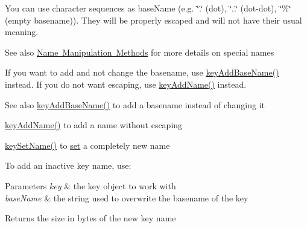You can use character sequences as {\ttfamily base\+Name} (e.\+g. {\ttfamily \char`\"{}.\char`\"{}} (dot), {\ttfamily \char`\"{}..\char`\"{}} (dot-\/dot), {\ttfamily \char`\"{}\%\char`\"{}} (empty basename)). They will be properly escaped and will not have their usual meaning.

\begin{DoxySeeAlso}{See also}
\mbox{\hyperlink{group__keyname}{Name Manipulation Methods}} for more details on special names
\end{DoxySeeAlso}
If you want to add and not change the basename, use \mbox{\hyperlink{group__keyname_gaa942091fc4bd5c2699e49ddc50829524}{key\+Add\+Base\+Name()}} instead. If you do not want escaping, use \mbox{\hyperlink{group__keyname_gaa70593a2c772c4b7bc33423b9b10a270}{key\+Add\+Name()}} instead.

\begin{DoxySeeAlso}{See also}
\mbox{\hyperlink{group__keyname_gaa942091fc4bd5c2699e49ddc50829524}{key\+Add\+Base\+Name()}} to add a basename instead of changing it 

\mbox{\hyperlink{group__keyname_gaa70593a2c772c4b7bc33423b9b10a270}{key\+Add\+Name()}} to add a name without escaping 

\mbox{\hyperlink{group__keyname_ga7699091610e7f3f43d2949514a4b35d9}{key\+Set\+Name()}} to \mbox{\hyperlink{classkdb_1_1Key_a615124f0a2b291e03975b49c233654d7}{set}} a completely new name
\end{DoxySeeAlso}
To add an inactive key name, use\+: 
\begin{DoxyCodeInclude}{0}
\end{DoxyCodeInclude}
 
\begin{DoxyParams}{Parameters}
{\em key} & the key object to work with \\
\hline
{\em base\+Name} & the string used to overwrite the basename of the key \\
\hline
\end{DoxyParams}
\begin{DoxyReturn}{Returns}
the size in bytes of the new key name 
\end{DoxyReturn}

